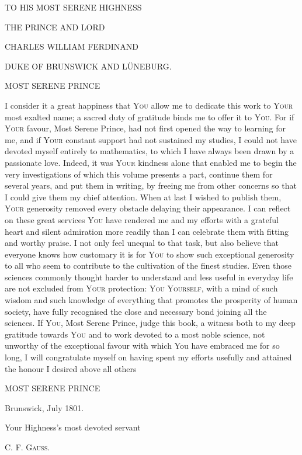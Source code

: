 \begin{center}
\textsc{TO HIS MOST SERENE HIGHNESS}

\smallskip

\textsc{THE PRINCE AND LORD}

\smallskip

{\Large\textsc{CHARLES WILLIAM FERDINAND}}

\smallskip

\textsc{DUKE OF BRUNSWICK AND LÜNEBURG.}

\smallskip


\smallskip

\textsc{MOST SERENE PRINCE}
\end{center}

\noindent I consider it a great happiness that \textsc{You} allow me to dedicate this work to \textsc{Your} most exalted name; a sacred duty of gratitude binds me to offer it to \textsc{You}. For if \textsc{Your} favour, Most Serene Prince, had not first opened the way to learning for me, and if \textsc{Your} constant support had not sustained my studies, I could not have devoted myself entirely to mathematics, to which I have always been drawn by a passionate love. Indeed, it was \textsc{Your} kindness alone that enabled me to begin the very investigations of which this volume presents a part, continue them for several years, and put them in writing, by freeing me from other concerns so that I could give them my chief attention. When at last I wished to publish them, \textsc{Your} generosity removed every obstacle delaying their appearance. I can reflect on these great services \textsc{You} have rendered me and my efforts with a grateful heart and silent admiration more readily than I can celebrate them with fitting and worthy praise. I not only feel unequal to that task, but also believe that everyone knows how customary it is for \textsc{You} to show such exceptional generosity to all who seem to contribute to the cultivation of the finest studies. Even those sciences commonly thought harder to understand and less useful in everyday life are not excluded from \textsc{Your} protection: \textsc{You Yourself}, with a mind of such wisdom and such knowledge of everything that promotes the prosperity of human society, have fully recognised the close and necessary bond joining all the sciences. If \textsc{You}, Most Serene Prince, judge this book, a witness both to my deep gratitude towards \textsc{You} and to work devoted to a most noble science, not unworthy of the exceptional favour with which You have embraced me for so long, I will congratulate myself on having spent my efforts usefully and attained the honour I desired above all others

\begin{center}
\textsc{MOST SERENE PRINCE}
\end{center}

\noindent\hspace*{1.5em}Brunswick, July 1801.

\smallskip
\begin{flushright}
Your Highness's most devoted servant

\smallskip
\textsc{C. F. Gauss.}
\end{flushright}
